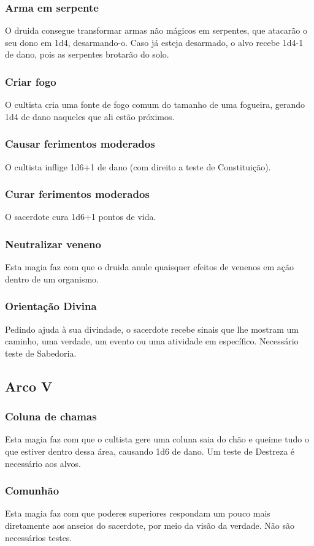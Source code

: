 \documentclass[10pt,twoside,twocolumn]{book}
\begin{document}
\subsubsection*{Arma em serpente}
O druida consegue transformar armas não mágicos em serpentes,
que atacarão o seu dono em 1d4, desarmando-o. Caso já esteja desarmado, o alvo recebe 1d4-1 de dano, pois as serpentes brotarão do solo. 
\subsubsection*{Criar fogo}
O cultista cria uma fonte de fogo comum do tamanho de uma fogueira, gerando 1d4 de dano naqueles que ali estão próximos.
\subsubsection*{Causar ferimentos moderados}
O cultista inflige 1d6+1 de dano (com direito a teste de Constituição).
\subsubsection*{Curar ferimentos moderados}
O sacerdote cura 1d6+1 pontos de vida.
\subsubsection*{Neutralizar veneno}
Esta magia faz com que o druida anule quaisquer efeitos de venenos em ação dentro de um organismo.
\subsubsection*{Orientação Divina}
Pedindo ajuda à sua divindade, o sacerdote recebe sinais que lhe mostram
um caminho, uma verdade, um evento ou uma atividade em específico. Necessário teste de Sabedoria.

\subsection*{Arco V}
\subsubsection*{Coluna de chamas}
Esta magia faz com que o cultista gere uma coluna saia do chão e queime tudo o que estiver dentro dessa área, causando 1d6 de dano. Um teste de Destreza é necessário aos alvos.
\subsubsection*{Comunhão}
Esta magia faz com que poderes superiores respondam um pouco mais diretamente aos anseios do sacerdote, por meio da visão da verdade. Não são necessários testes.
\end{document}

